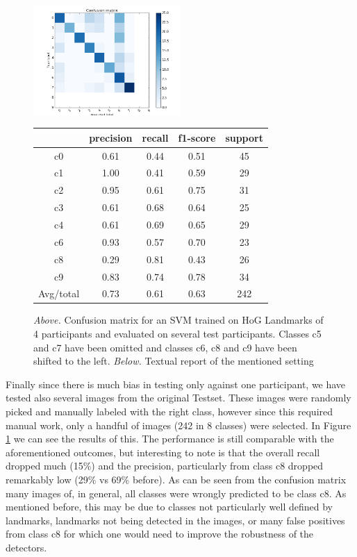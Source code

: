 \documentclass[10pt,twocolumn,letterpaper]{article}
\begin{document}
\begin{figure}[h]
	\centering
	\includegraphics[width=0.5\textwidth]{mult_HOG/4c01234689matTest}
		\begin{tabular}{c||c|c|c|c}
			& precision&recall&f1-score&support\\	\hline
			c0&0.61&0.44&0.51&45\\
			c1&1.00&0.41&0.59&29\\
			c2&0.95&0.61&0.75&31\\
			c3&0.61&0.68&0.64&25\\
			c4&0.61&0.69&0.65&29\\
			c6&0.93&0.57&0.70&23\\
			c8&0.29&0.81&0.43&26\\
			c9&0.83&0.74&0.78&34\\ \hline
			Avg/total &0.73&0.61& 0.63 &242
		\end{tabular}
	\caption{\textit{Above.} Confusion matrix for an SVM trained on HoG Landmarks of 4 participants and evaluated on several test participants. Classes c5 and c7 have been omitted and classes c6, c8 and c9 have been shifted to the left. \textit{Below.} Textual report of the mentioned setting}
	\label{Landmarks_4no5no7test}
\end{figure}

Finally since there is much bias in testing only against one participant, we have tested also several images from the original Testset. These images were randomly picked and manually labeled with the right class, however since this required manual work, only a handful of images (242 in 8 classes) were selected. In Figure \ref{Landmarks_4no5no7test} we can see the results of this. The performance is still comparable with the aforementioned outcomes, but interesting to note is that the overall recall dropped much (15\%) and the precision, particularly from class c8 dropped remarkably low (29\% vs 69\% before). As can be seen from the confusion matrix many images of, in general, all classes were wrongly predicted to be class c8. As mentioned before, this may be due to classes not particularly well defined by landmarks, landmarks not being detected in the images, or many false positives from class c8 for which one would need to improve the robustness of the detectors.
\end{document}
